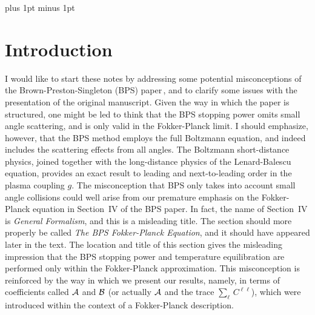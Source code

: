 \documentclass[preprint,12pt,eqsecnum,nofootinbib,amsmath,amssymb]{revtex4}
\newcommand{\bodyskip}{\baselineskip 18pt plus 1pt minus 1pt}
\newcommand{\tableofcontentsskip}{\baselineskip 14pt plus 1pt minus 1pt}
\begin{document}


\newpage
\bodyskip

\pagebreak
\clearpage
%

\section{Introduction}
\label{sec:intro}


I would like to start these notes by addressing some potential misconceptions
of the Brown-Preston-Singleton (BPS) paper\,\cite{BPS2005}, and to clarify 
some issues with the presentation of the original manuscript. Given 
the way in which the paper is structured, one might be led to think 
that the BPS stopping power omits small angle scattering, and is 
only valid in the Fokker-Planck limit. I should emphasize, however, 
that the BPS method employs the full Boltzmann equation, and 
indeed includes the scattering effects from all angles. The
Boltzmann short-distance physics, joined together with  the 
long-distance physics of  the Lenard-Balescu equation, provides 
an exact result to leading and next-to-leading order in the plasma 
coupling $g$. The misconception that BPS only takes into account
small angle collisions could well arise from our 
premature emphasis  on the Fokker-Planck equation in Section~IV 
of the BPS paper. In fact, the name of Section~IV  is {\em General 
Formalism}, and this is a misleading title. The section 
should more properly be called {\em The BPS Fokker-Planck Equation}, 
and it should have appeared later in the text. The location and title 
of this section gives the misleading impression that the BPS stopping 
power and temperature equilibration are performed only within the 
Fokker-Planck approximation. This misconception is reinforced by 
the way in which we present our results, namely, in terms of 
coefficients called ${\cal A}$ and ${\cal B}$ (or actually ${\cal A}$ 
and the trace ${\sum}_\ell \, C^{\ell \ell}$),  which were  introduced 
within the context of a Fokker-Planck description. 
\end{document}
